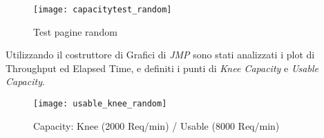 \begin{figure}[!htbp]
  \centering
  \texttt{[image: capacitytest\_random]}
  \caption{Test pagine random}
  \label{random_page_summary_report}
\end{figure}

Utilizzando il costruttore di Grafici di \textit{JMP} sono stati analizzati i plot
di Throughput ed Elapsed Time, e definiti i punti di \textit{Knee Capacity} e
\textit{Usable Capacity}.\\

\begin{figure}[!htbp]
  \centering
  \texttt{[image: usable\_knee\_random]}
  \caption{Capacity: Knee (2000 Req/min) / Usable (8000 Req/min)}
\end{figure}

